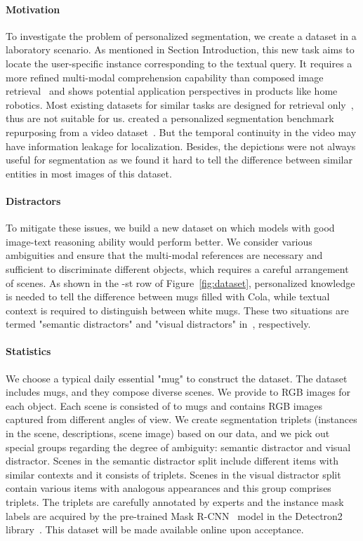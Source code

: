 \documentclass[letterpaper]{article} \usepackage[submission]{aaai24}  \usepackage{times}  \usepackage{helvet}  \usepackage{courier}  \usepackage[hyphens]{url}  \usepackage{graphicx} \urlstyle{rm} \def\UrlFont{\rm}  \usepackage{natbib}  \usepackage{caption} \frenchspacing  \setlength{\pdfpagewidth}{8.5in} \setlength{\pdfpageheight}{11in} \usepackage{algorithm}
\begin{document}
\paragraph{Motivation}

To investigate the problem of personalized segmentation, we create a dataset in a laboratory scenario.
As mentioned in Section Introduction, this new task aims to locate the user-specific instance corresponding to the textual query.
It requires a more refined multi-modal comprehension capability than composed image retrieval~\cite{CIR} and shows potential application perspectives in products like home robotics.
Most existing datasets for similar tasks are designed for retrieval only~\cite{CIR, CIRR, fashioniq}, thus are not suitable for us.
\cite{PALAVRA} created a personalized segmentation benchmark repurposing from a video dataset~\cite{YouTube-VOS}.
But the temporal continuity in the video may have information leakage for localization.
Besides, the depictions were not always useful for segmentation as we found it hard to tell the difference between similar entities in most images of this dataset.

\paragraph{Distractors}

To mitigate these issues, we build a new dataset on which models with good image-text reasoning ability would perform better.
We consider various ambiguities and ensure that the multi-modal references are necessary and sufficient to discriminate different objects, which requires a careful arrangement of scenes.
As shown in the -st row of Figure~\ref{fig:dataset}, personalized knowledge is needed to tell the difference between  mugs filled with Cola, while textual context is required to distinguish between  white mugs.
These two situations are termed "semantic distractors" and "visual distractors" in~\cite{PALAVRA}, respectively.

\paragraph{Statistics}

We choose a typical daily essential "mug" to construct the dataset.
The dataset includes  mugs, and they compose  diverse scenes. 
We provide  to   RGB images for each object. 
Each scene is consisted of  to  mugs and contains   RGB images captured from different angles of view.
We create  segmentation triplets (instances in the scene, descriptions, scene image) based on our data, and we pick out  special groups regarding the degree of ambiguity: semantic distractor and visual distractor.
Scenes in the semantic distractor split include different items with similar contexts and it consists of  triplets.
Scenes in the visual distractor split contain various items with analogous appearances and this group comprises  triplets.
The triplets are carefully annotated by experts and the instance mask labels are acquired by the pre-trained Mask R-CNN~\cite{maskrcnn} model in the Detectron2 library~\cite{detectron2}.
This dataset will be made available online upon acceptance.
\end{document}

